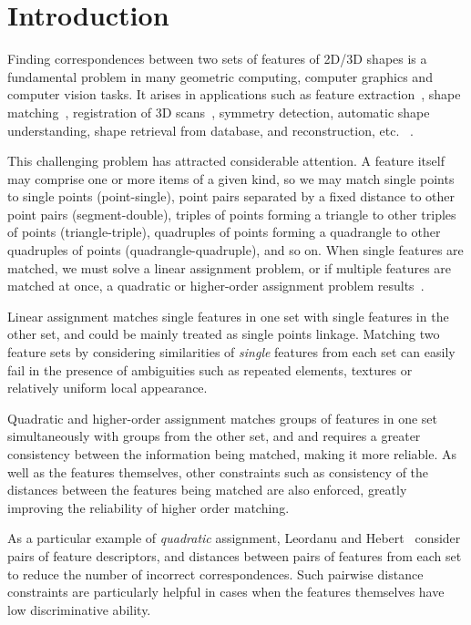 \section{Introduction}
\label{sec:introduction}

Finding correspondences between two sets of features of 2D/3D shapes is a fundamental problem in many geometric computing,
computer graphics and computer vision tasks.
It arises in applications such as feature extraction~\cite{Lowe04,Berg05,Johnson99,Sun09,Leutenegger11},
shape matching~\cite{Belongie02,Brown07,Bronstein11}, registration of 3D scans~\cite{Aiger08},
symmetry detection, automatic shape understanding, shape retrieval from database, and reconstruction, etc.
~\cite{Chang11,Kim11,Lipman09,vanKaick11,Toler10,Tevs11,Tevs09,SahilliogluY11,Ovsjanikov10,Sun10,Windheuser11,Zeng10}.

This challenging problem has attracted considerable attention.
A feature itself may comprise one or more items of a given kind,
so we may match single points to single points (point-single),
point pairs separated by a fixed distance to other point pairs (segment-double),
triples of points forming a triangle to other triples of points (triangle-triple),
quadruples of points forming a quadrangle to other quadruples of points (quadrangle-quadruple), and so on.
When single features are matched,
we must solve a linear assignment problem,
or if multiple features are matched at once,
a quadratic or higher-order assignment problem results~\cite{Conte04}.

Linear assignment matches single features in one set with single features in the other set, and could be mainly treated as single points linkage.
Matching two feature sets by considering similarities of \emph{single} features from each set can easily fail in the presence of ambiguities such as repeated elements,
textures or relatively uniform local appearance.

Quadratic and higher-order assignment matches groups of features in one set simultaneously with groups from the other set,
and and requires a greater consistency between the information being matched, making it more reliable.
As well as the features themselves, other constraints such as consistency of the distances between the features being matched are also enforced,
greatly improving the reliability of higher order matching.

As a particular example of \emph{quadratic} assignment, Leordanu and Hebert~\cite{Leordeanu05} consider pairs of feature descriptors,
and distances between pairs of features from each set to reduce the number of incorrect correspondences.
Such pairwise distance constraints are particularly helpful in cases when the features themselves have low discriminative ability.

